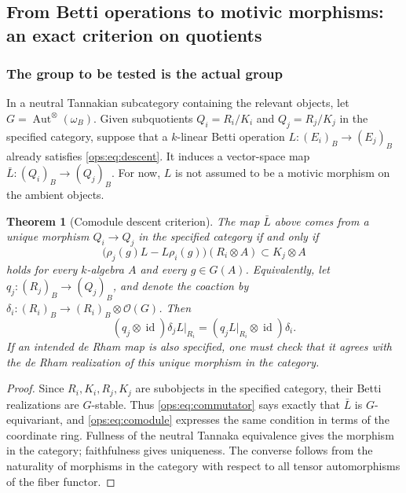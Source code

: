 \documentclass[11pt,a4paper,oneside]{article}
\theoremstyle{plain}
\newtheorem{theorem}{Theorem}[section]
\theoremstyle{definition}
\theoremstyle{remark}
\newcommand{\id}{\operatorname{id}}
\numberwithin{equation}{section}
\begin{document}
\subsection{From Betti operations to motivic morphisms: an exact criterion on quotients}
\subsubsection{The group to be tested is the actual group}
In a neutral Tannakian subcategory containing the relevant objects, let
$G=\operatorname{Aut}^{\otimes}(\omega_B)$.
Given subquotients $Q_i=R_i/K_i$ and $Q_j=R_j/K_j$ in the specified category,
suppose that a $k$-linear Betti operation $L:(E_i)_B\to(E_j)_B$ already satisfies
\eqref{ops:eq:descent}. It induces a vector-space map $\bar L:(Q_i)_B\to(Q_j)_B$.
For now, $L$ is not assumed to be a motivic morphism on the ambient objects.

\begin{theorem}[Comodule descent criterion]\label{ops:thm:intertwine}
The map $\bar L$ above comes from a unique morphism $Q_i\to Q_j$ in the specified category if and only if
\begin{equation}\label{ops:eq:commutator}
 \bigl(\rho_j(g)L-L\rho_i(g)\bigr)(R_i\otimes A)
       \subset K_j\otimes A
\end{equation}
holds for every $k$-algebra $A$ and every $g\in G(A)$.
Equivalently, let $q_j:(R_j)_B\to(Q_j)_B$, and denote the coaction by
$\delta_i:(R_i)_B\to(R_i)_B\otimes\mathcal O(G)$. Then
\begin{equation}\label{ops:eq:comodule}
 (q_j\otimes\id)\delta_j L|_{R_i}
       =(q_jL|_{R_i}\otimes\id)\delta_i.
\end{equation}
If an intended de Rham map is also specified, one must check that it agrees with the
de Rham realization of this unique morphism in the category.
\end{theorem}
\begin{proof}
Since $R_i,K_i,R_j,K_j$ are subobjects in the specified category, their Betti realizations are $G$-stable.
Thus \eqref{ops:eq:commutator} says exactly that $\bar L$ is $G$-equivariant,
and \eqref{ops:eq:comodule} expresses the same condition in terms of the coordinate ring.
Fullness of the neutral Tannaka equivalence gives the morphism in the category; faithfulness gives uniqueness.
The converse follows from the naturality of morphisms in the category with respect to all tensor automorphisms of the fiber functor.
\end{proof}
\end{document}
